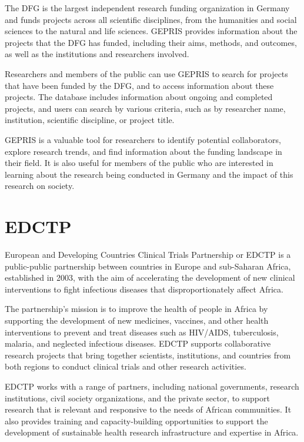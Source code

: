 \documentclass[
]{book}
\begin{document}
The DFG is the largest independent research funding organization in Germany and funds projects across all scientific disciplines, from the humanities and social sciences to the natural and life sciences. GEPRIS provides information about the projects that the DFG has funded, including their aims, methods, and outcomes, as well as the institutions and researchers involved.

Researchers and members of the public can use GEPRIS to search for projects that have been funded by the DFG, and to access information about these projects. The database includes information about ongoing and completed projects, and users can search by various criteria, such as by researcher name, institution, scientific discipline, or project title.

GEPRIS is a valuable tool for researchers to identify potential collaborators, explore research trends, and find information about the funding landscape in their field. It is also useful for members of the public who are interested in learning about the research being conducted in Germany and the impact of this research on society.

\hypertarget{edctp}{%
\section{EDCTP}\label{edctp}}

European and Developing Countries Clinical Trials Partnership or EDCTP is a public-public partnership between countries in Europe and sub-Saharan Africa, established in 2003, with the aim of accelerating the development of new clinical interventions to fight infectious diseases that disproportionately affect Africa.

The partnership's mission is to improve the health of people in Africa by supporting the development of new medicines, vaccines, and other health interventions to prevent and treat diseases such as HIV/AIDS, tuberculosis, malaria, and neglected infectious diseases. EDCTP supports collaborative research projects that bring together scientists, institutions, and countries from both regions to conduct clinical trials and other research activities.

EDCTP works with a range of partners, including national governments, research institutions, civil society organizations, and the private sector, to support research that is relevant and responsive to the needs of African communities. It also provides training and capacity-building opportunities to support the development of sustainable health research infrastructure and expertise in Africa.
\end{document}
